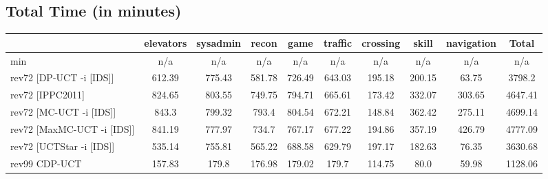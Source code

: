 \documentclass{article}
\begin{document}
\bigskip

\subsection*{Total Time (in minutes)}

\begin{tabular}{|l|r@{$\pm$}rr@{$\pm$}rr@{$\pm$}rr@{$\pm$}rr@{$\pm$}rr@{$\pm$}rr@{$\pm$}rr@{$\pm$}rr@{$\pm$}r|}
\hline

& \multicolumn{2}{c}{elevators}
& \multicolumn{2}{c}{sysadmin}
& \multicolumn{2}{c}{recon}
& \multicolumn{2}{c}{game}
& \multicolumn{2}{c}{traffic}
& \multicolumn{2}{c}{crossing}
& \multicolumn{2}{c}{skill}
& \multicolumn{2}{c}{navigation}
& \multicolumn{2}{c|}{Total}
\\
\hline
\hline
min
& \multicolumn{2}{c}{n/a}
& \multicolumn{2}{c}{n/a}
& \multicolumn{2}{c}{n/a}
& \multicolumn{2}{c}{n/a}
& \multicolumn{2}{c}{n/a}
& \multicolumn{2}{c}{n/a}
& \multicolumn{2}{c}{n/a}
& \multicolumn{2}{c}{n/a}
& \multicolumn{2}{c|}{n/a}
\\
rev72 [DP-UCT -i [IDS]]
& \multicolumn{2}{c}{612.39}
& \multicolumn{2}{c}{775.43}
& \multicolumn{2}{c}{581.78}
& \multicolumn{2}{c}{726.49}
& \multicolumn{2}{c}{643.03}
& \multicolumn{2}{c}{195.18}
& \multicolumn{2}{c}{200.15}
& \multicolumn{2}{c}{63.75}
& \multicolumn{2}{c|}{3798.2}
\\
rev72 [IPPC2011]
& \multicolumn{2}{c}{824.65}
& \multicolumn{2}{c}{803.55}
& \multicolumn{2}{c}{749.75}
& \multicolumn{2}{c}{794.71}
& \multicolumn{2}{c}{665.61}
& \multicolumn{2}{c}{173.42}
& \multicolumn{2}{c}{332.07}
& \multicolumn{2}{c}{303.65}
& \multicolumn{2}{c|}{4647.41}
\\
rev72 [MC-UCT -i [IDS]]
& \multicolumn{2}{c}{843.3}
& \multicolumn{2}{c}{799.32}
& \multicolumn{2}{c}{793.4}
& \multicolumn{2}{c}{804.54}
& \multicolumn{2}{c}{672.21}
& \multicolumn{2}{c}{148.84}
& \multicolumn{2}{c}{362.42}
& \multicolumn{2}{c}{275.11}
& \multicolumn{2}{c|}{4699.14}
\\
rev72 [MaxMC-UCT -i [IDS]]
& \multicolumn{2}{c}{841.19}
& \multicolumn{2}{c}{777.97}
& \multicolumn{2}{c}{734.7}
& \multicolumn{2}{c}{767.17}
& \multicolumn{2}{c}{677.22}
& \multicolumn{2}{c}{194.86}
& \multicolumn{2}{c}{357.19}
& \multicolumn{2}{c}{426.79}
& \multicolumn{2}{c|}{4777.09}
\\
rev72 [UCTStar -i [IDS]]
& \multicolumn{2}{c}{535.14}
& \multicolumn{2}{c}{755.81}
& \multicolumn{2}{c}{565.22}
& \multicolumn{2}{c}{688.58}
& \multicolumn{2}{c}{629.79}
& \multicolumn{2}{c}{197.17}
& \multicolumn{2}{c}{182.63}
& \multicolumn{2}{c}{76.35}
& \multicolumn{2}{c|}{3630.68}
\\
\hline
rev99 CDP-UCT
& \multicolumn{2}{c}{157.83}
& \multicolumn{2}{c}{179.8}
& \multicolumn{2}{c}{176.98}
& \multicolumn{2}{c}{179.02}
& \multicolumn{2}{c}{179.7}
& \multicolumn{2}{c}{114.75}
& \multicolumn{2}{c}{80.0}
& \multicolumn{2}{c}{59.98}
& \multicolumn{2}{c|}{1128.06}
\\
\hline
\end{tabular}%
\end{document}
